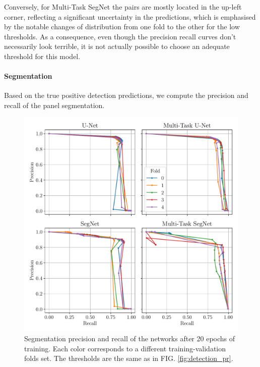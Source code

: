 \documentclass[twocolumn,superscriptaddress,aps,nofootinbib]{revtex4-1}
\begin{document}
Conversely, for Multi-Task SegNet the pairs are mostly located in the up-left corner, reflecting a significant uncertainty in the predictions, which is emphasised by the notable changes of distribution from one fold to the other for the low thresholds. As a consequence, even though the precision recall curves don't necessarily look terrible, it is not actually possible to choose an adequate threshold for this model.

\vspace{1em}

\paragraph{Segmentation}

Based on the true positive detection predictions, we compute the precision and recall of the panel segmentation.

\begin{figure}[h]
    \centering
    \vspace{-1em}
    \includegraphics[width=\columnwidth]{resources/pdf/segmentation_pr.pdf}
    \vspace{-2em}
    \caption{Segmentation precision and recall of the networks after 20 epochs of training. Each color corresponds to a different training-validation folds set. The thresholds are the same as in FIG. \ref{fig:detection_pr}.}
    \label{fig:segmentation_pr}
\end{figure}
\end{document}
